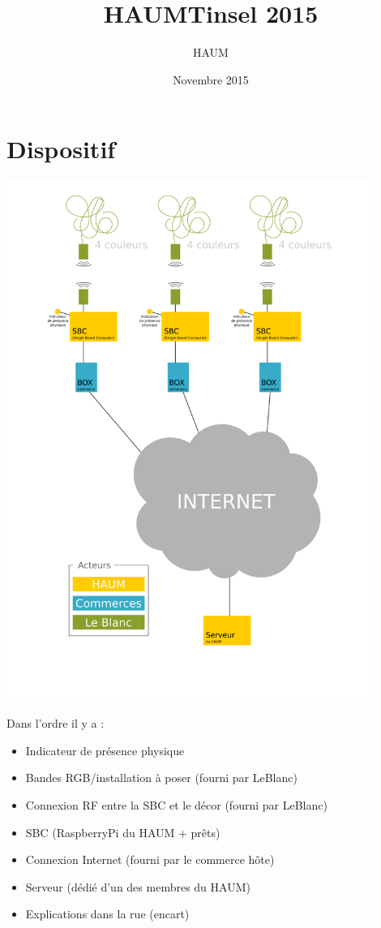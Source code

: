 \documentclass[a4paper, 11pt]{article}
\title{HAUMTinsel 2015}
\author{HAUM}
\date{Novembre 2015}
\begin{document}
	\maketitle

\section{Dispositif}

\includegraphics[width=12cm]{general_architecture.png}

Dans l'ordre il y a :

\begin{itemize}
	\item Indicateur de présence physique
	\item Bandes RGB/installation à poser (fourni par LeBlanc)
	\item Connexion RF entre la SBC et le décor (fourni par LeBlanc)
	\item SBC (RaspberryPi du HAUM + prêts)
	\item Connexion Internet (fourni par le commerce hôte)
	\item Serveur (dédié d'un des membres du HAUM)
	\item Explications dans la rue (encart)
\end{itemize}
\end{document}
